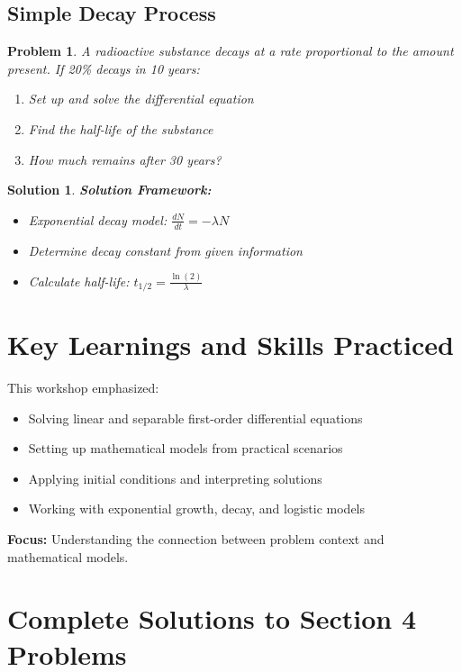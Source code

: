 \documentclass[12pt, letterpaper]{book}
\newcounter{problemcounter}[chapter]
\theoremstyle{problemstyle}
\newtheorem{problem}[problemcounter]{Problem}
\theoremstyle{solutionstyle}
\newtheorem*{solution}{Solution}
\begin{document}
\subsection{Simple Decay Process}

\begin{problem}
A radioactive substance decays at a rate proportional to the amount present. If 20\% decays in 10 years:
\begin{enumerate}
    \item Set up and solve the differential equation
    \item Find the half-life of the substance
    \item How much remains after 30 years?
\end{enumerate}
\end{problem}

\begin{solution}
\textbf{Solution Framework:}
\begin{itemize}
    \item Exponential decay model: $\frac{dN}{dt} = -\lambda N$
    \item Determine decay constant from given information
    \item Calculate half-life: $t_{1/2} = \frac{\ln(2)}{\lambda}$
\end{itemize}
\end{solution}

\section{Key Learnings and Skills Practiced}
This workshop emphasized:
\begin{itemize}
    \item Solving linear and separable first-order differential equations
    \item Setting up mathematical models from practical scenarios
    \item Applying initial conditions and interpreting solutions
    \item Working with exponential growth, decay, and logistic models
\end{itemize}

\textbf{Focus:} Understanding the connection between problem context and mathematical models.

\section{Complete Solutions to Section 4 Problems}
\end{document}
